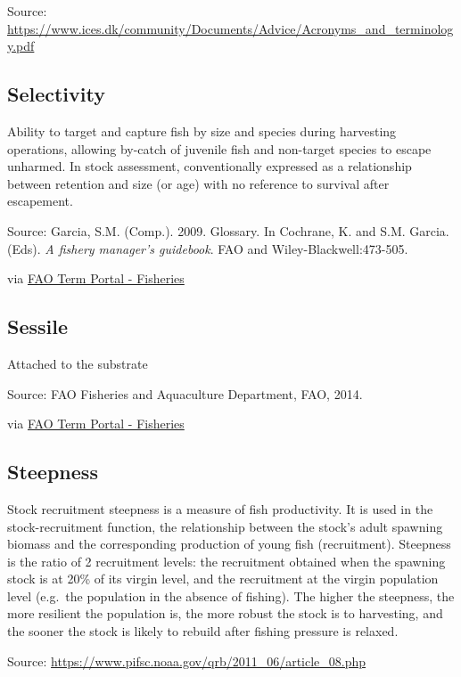 \documentclass[
  11pt,
]{book}
\begin{document}
Source: \url{https://www.ices.dk/community/Documents/Advice/Acronyms_and_terminology.pdf}

\hypertarget{selectivity}{%
\subsection{Selectivity}\label{selectivity}}

Ability to target and capture fish by size and species during harvesting operations, allowing by-catch of juvenile fish and non-target species to escape unharmed. In stock assessment, conventionally expressed as a relationship between retention and size (or age) with no reference to survival after escapement.

Source: Garcia, S.M. (Comp.). 2009. Glossary. In Cochrane, K. and S.M. Garcia. (Eds). \emph{A fishery manager's guidebook}. FAO and Wiley-Blackwell:473-505.

via \href{http://www.fao.org/fishery/glossary/en}{FAO Term Portal - Fisheries}

\hypertarget{sessile}{%
\subsection{Sessile}\label{sessile}}

Attached to the substrate

Source: FAO Fisheries and Aquaculture Department, FAO, 2014.

via \href{http://www.fao.org/fishery/glossary/en}{FAO Term Portal - Fisheries}

\hypertarget{steepness}{%
\subsection{Steepness}\label{steepness}}

Stock recruitment steepness is a measure of fish productivity. It is used in the stock-recruitment function, the relationship between the stock's adult spawning biomass and the corresponding production of young fish (recruitment). Steepness is the ratio of 2 recruitment levels: the recruitment obtained when the spawning stock is at 20\% of its virgin level, and the recruitment at the virgin population level (e.g.~the population in the absence of fishing). The higher the steepness, the more resilient the population is, the more robust the stock is to harvesting, and the sooner the stock is likely to rebuild after fishing pressure is relaxed.

Source: \url{https://www.pifsc.noaa.gov/qrb/2011_06/article_08.php}
\end{document}
